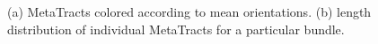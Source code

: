 




\begin{figure}[h]
\centering
	\caption{(a) MetaTracts colored according to mean orientations. (b) length distribution of individual MetaTracts for a particular bundle.}
	\label{fig:length_distribution}
\end{figure}

